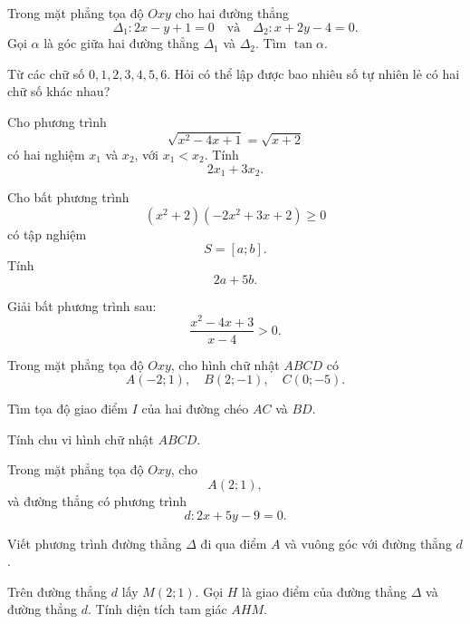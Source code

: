 
\NQuestion Trong mặt phẳng tọa độ $Oxy$ cho hai đường thẳng
\[
\Delta_1:2x-y+1=0
\quad \text{và} \quad
\Delta_2:x+2y-4=0.
\]
Gọi $\alpha$ là góc giữa hai đường thẳng $\Delta_1$ và $\Delta_2$. Tìm $\tan\alpha$.

\NQuestion Từ các chữ số $0,1,2,3,4,5,6$. Hỏi có thể lập được bao nhiêu số tự nhiên lẻ có hai chữ số khác nhau?

\NQuestion Cho phương trình
\[
\sqrt{x^2-4x+1}=\sqrt{x+2}
\]
có hai nghiệm $x_1$ và $x_2$, với $x_1<x_2$. Tính
\[
2x_1+3x_2.
\]

\NQuestion Cho bất phương trình
\[
\left(x^2+2\right)\left(-2x^2+3x+2\right)\ge 0
\]
có tập nghiệm
\[
S=\left[a;b\right].
\]
Tính
\[
2a+5b.
\]


\NQuestion Giải bất phương trình sau:
\[
\dfrac{x^2-4x+3}{x-4}>0.
\]

\NQuestion Trong mặt phẳng tọa độ $Oxy$, cho hình chữ nhật $ABCD$ có
\[
A\left(-2;1\right),\quad B\left(2;-1\right),\quad C\left(0;-5\right).
\]
\begin{SubQuestions}
\item Tìm tọa độ giao điểm $I$ của hai đường chéo $AC$ và $BD$.
\item Tính chu vi hình chữ nhật $ABCD$.
\end{SubQuestions}

\NQuestion Trong mặt phẳng tọa độ $Oxy$, cho
\[
A\left(2;1\right),
\]
và đường thẳng có phương trình
\[
d:2x+5y-9=0.
\]
\begin{SubQuestions}
\item Viết phương trình đường thẳng $\Delta$ đi qua điểm $A$ và vuông góc với đường thẳng $d$.
\item Trên đường thẳng $d$ lấy $M(2;1)$. Gọi $H$ là giao điểm của đường thẳng $\Delta$ và đường thẳng $d$. Tính diện tích tam giác $AHM$.
\end{SubQuestions}
